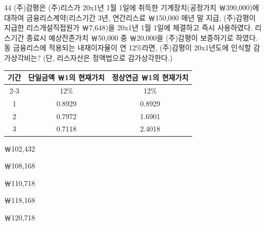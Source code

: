 \begin{question}{44}
(주)감평은 (주)리스가 20x1년 1월 1일에 취득한 기계장치(공정가치 ￦390,000)에 대하여 금융리스계약(리스기간 3년, 연간리스료 ￦150,000 매년 말 지급, (주)감평이 지급한 리스개설직접원가 ￦7,648)을 20x1년 1월 1일에 체결하고 즉시 사용하였다. 리스기간 종료시 예상잔존가치 ￦50,000 중 ￦20,000을 (주)감평이 보증하기로 하였다. 동 금융리스에 적용되는 내재이자율이 연 12\%라면, (주)감평이 20x1년도에 인식할 감가상각비는? (단, 리스자산은 정액법으로 감가상각한다.)
\par{\small\centering\begin{tabular}{|c|c|c|}
\hline
\multirow{2}{*}{기간} & 단일금액 ￦1의 현재가치 & 정상연금 ￦1의 현재가치 \\
\cline{2-3}
 & 12\% & 12\% \\
\hline
1 & 0.8929 & 0.8929 \\
2 & 0.7972 & 1.6901 \\
3 & 0.7118 & 2.4018 \\
\hline
\end{tabular}\par}
\begin{choices}
  \item ￦102,432
  \item ￦108,168
  \item ￦110,718
  \item ￦118,168
  \item ￦120,718
\end{choices}
\end{question}
